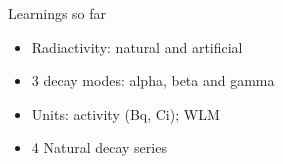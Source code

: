 \begin{frame}{Learnings so far}

\begin{alertblock}{}

\begin{itemize}

\pause \item Radiactivity: natural and artificial

\pause \item 3 decay modes: alpha, beta and gamma

\pause \item Units: activity (Bq, Ci); WLM

\pause \item  4 Natural decay series


\end{itemize}

\end{alertblock}

\end{frame}